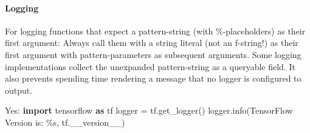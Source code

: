 \documentclass[
]{article}
\newenvironment{Shaded}{}{}
\newcommand{\ControlFlowTok}[1]{\textcolor[rgb]{0.00,0.44,0.13}{\textbf{#1}}}
\newcommand{\ImportTok}[1]{\textcolor[rgb]{0.00,0.50,0.00}{\textbf{#1}}}
\newcommand{\KeywordTok}[1]{\textcolor[rgb]{0.00,0.44,0.13}{\textbf{#1}}}
\newcommand{\NormalTok}[1]{#1}
\newcommand{\OperatorTok}[1]{\textcolor[rgb]{0.40,0.40,0.40}{#1}}
\newcommand{\SpecialCharTok}[1]{\textcolor[rgb]{0.25,0.44,0.63}{#1}}
\newcommand{\StringTok}[1]{\textcolor[rgb]{0.25,0.44,0.63}{#1}}
\newcommand{\VariableTok}[1]{\textcolor[rgb]{0.10,0.09,0.49}{#1}}
\begin{document}
\paragraph{Logging}

For logging functions that expect a pattern-string (with
\%-placeholders) as their first argument: Always call them with a string
literal (not an f-string!) as their first argument with
pattern-parameters as subsequent arguments. Some logging implementations
collect the unexpanded pattern-string as a queryable field. It also
prevents spending time rendering a message that no logger is configured
to output.

\begin{samepage}
\begin{Shaded}
\begin{Highlighting}[]
\NormalTok{  Yes:}
  \ImportTok{import}\NormalTok{ tensorflow }\ImportTok{as}\NormalTok{ tf}
\NormalTok{  logger }\OperatorTok{=}\NormalTok{ tf.get\_logger()}
\NormalTok{  logger.info(}\StringTok{\textquotesingle{}TensorFlow Version is: }\SpecialCharTok{\%s}\StringTok{\textquotesingle{}}\NormalTok{, tf.\_\_version\_\_)}
\end{Highlighting}
\end{Shaded}
\end{samepage}

\begin{samepage}
\begin{Shaded}
\end{Shaded}
\end{samepage}
\end{document}
